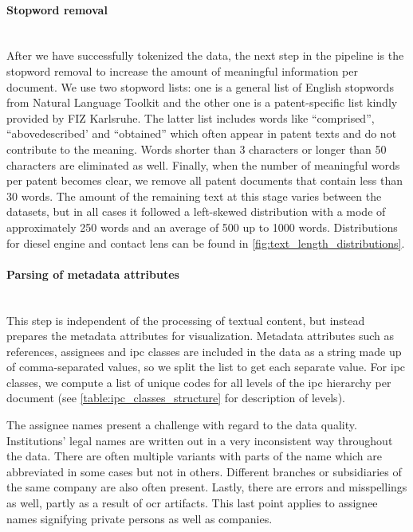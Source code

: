\paragraph{Stopword removal}~\\
After we have successfully tokenized the data, the next step in the pipeline is the stopword removal to increase the amount of meaningful information per document.
We use two stopword lists: one is a general list of English stopwords from Natural Language Toolkit \cite{bird2009natural} and the other one is a patent-specific list kindly provided by FIZ Karlsruhe.
The latter list includes words like ``comprised'', ``abovedescribed' and ``obtained'' which often appear in patent texts and do not contribute to the meaning.
Words shorter than 3 characters or longer than 50 characters are eliminated as well.
Finally, when the number of meaningful words per patent becomes clear, we remove all patent documents that contain less than 30 words.
The amount of the remaining text at this stage varies between the datasets, but in all cases it followed a left-skewed distribution with a mode of approximately 250 words and an average of 500 up to 1000 words.
Distributions for diesel engine and contact lens can be found in \autoref{fig:text_length_distributions}.
 
\paragraph{Parsing of metadata attributes}~\\
This step is independent of the processing of textual content, but instead prepares the metadata attributes for visualization.
Metadata attributes such as references, assignees and \gls{ipc} classes are included in the data as a string made up of comma-separated values, so we split the list to get each separate value.
For \gls{ipc} classes, we compute a list of unique codes for all levels of the \gls{ipc} hierarchy per document (see \autoref{table:ipc_classes_structure} for description of levels).

The assignee names present a challenge with regard to the data quality.
Institutions' legal names are written out in a very inconsistent way throughout the data.
There are often multiple variants with parts of the name which are abbreviated in some cases but not in others.
Different branches or subsidiaries of the same company are also often present.
Lastly, there are errors and misspellings as well, partly as a result of \gls{ocr} artifacts.
This last point applies to assignee names signifying private persons as well as companies.

